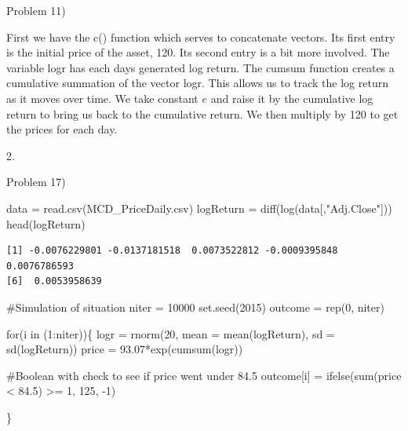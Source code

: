 \documentclass[
  letterpaper,
  DIV=11,
  numbers=noendperiod]{scrartcl}
\newenvironment{Shaded}{\begin{snugshade}}{\end{snugshade}}
\newcommand{\AttributeTok}[1]{\textcolor[rgb]{0.40,0.45,0.13}{#1}}
\newcommand{\CommentTok}[1]{\textcolor[rgb]{0.37,0.37,0.37}{#1}}
\newcommand{\ControlFlowTok}[1]{\textcolor[rgb]{0.00,0.23,0.31}{#1}}
\newcommand{\DecValTok}[1]{\textcolor[rgb]{0.68,0.00,0.00}{#1}}
\newcommand{\FloatTok}[1]{\textcolor[rgb]{0.68,0.00,0.00}{#1}}
\newcommand{\FunctionTok}[1]{\textcolor[rgb]{0.28,0.35,0.67}{#1}}
\newcommand{\NormalTok}[1]{\textcolor[rgb]{0.00,0.23,0.31}{#1}}
\newcommand{\OtherTok}[1]{\textcolor[rgb]{0.00,0.23,0.31}{#1}}
\newcommand{\SpecialCharTok}[1]{\textcolor[rgb]{0.37,0.37,0.37}{#1}}
\newcommand{\StringTok}[1]{\textcolor[rgb]{0.13,0.47,0.30}{#1}}
\begin{document}
Problem 11)

First we have the c() function which serves to concatenate vectors. Its
first entry is the initial price of the asset, 120. Its second entry is
a bit more involved. The variable logr has each days generated log
return. The cumsum function creates a cumulative summation of the vector
logr. This allows us to track the log return as it moves over time. We
take constant \(e\) and raise it by the cumulative log return to bring
us back to the cumulative return. We then multiply by 120 to get the
prices for each day.

2.

Problem 17)\\

\begin{Shaded}
\begin{Highlighting}[]
\NormalTok{data }\OtherTok{=} \FunctionTok{read.csv}\NormalTok{(}\StringTok{\textquotesingle{}MCD\_PriceDaily.csv\textquotesingle{}}\NormalTok{)}
\NormalTok{logReturn }\OtherTok{=} \FunctionTok{diff}\NormalTok{(}\FunctionTok{log}\NormalTok{(data[,}\StringTok{"Adj.Close"}\NormalTok{]))}
\FunctionTok{head}\NormalTok{(logReturn)}
\end{Highlighting}
\end{Shaded}

\begin{verbatim}
[1] -0.0076229801 -0.0137181518  0.0073522812 -0.0009395848  0.0076786593
[6]  0.0053958639
\end{verbatim}

\begin{Shaded}
\begin{Highlighting}[]
\CommentTok{\#Simulation of situation}
\NormalTok{niter }\OtherTok{=} \DecValTok{10000}
\FunctionTok{set.seed}\NormalTok{(}\DecValTok{2015}\NormalTok{)}
\NormalTok{outcome }\OtherTok{=} \FunctionTok{rep}\NormalTok{(}\DecValTok{0}\NormalTok{, niter)}

\ControlFlowTok{for}\NormalTok{(i }\ControlFlowTok{in}\NormalTok{ (}\DecValTok{1}\SpecialCharTok{:}\NormalTok{niter))\{}
\NormalTok{  logr }\OtherTok{=} \FunctionTok{rnorm}\NormalTok{(}\DecValTok{20}\NormalTok{, }\AttributeTok{mean =} \FunctionTok{mean}\NormalTok{(logReturn), }\AttributeTok{sd =} \FunctionTok{sd}\NormalTok{(logReturn))}
\NormalTok{  price }\OtherTok{=} \FloatTok{93.07}\SpecialCharTok{*}\FunctionTok{exp}\NormalTok{(}\FunctionTok{cumsum}\NormalTok{(logr))}
  
  \CommentTok{\#Boolean with check to see if price went under 84.5}
\NormalTok{  outcome[i] }\OtherTok{=} \FunctionTok{ifelse}\NormalTok{(}\FunctionTok{sum}\NormalTok{(price }\SpecialCharTok{\textless{}} \FloatTok{84.5}\NormalTok{) }\SpecialCharTok{\textgreater{}=} \DecValTok{1}\NormalTok{, }\DecValTok{125}\NormalTok{, }\SpecialCharTok{{-}}\DecValTok{1}\NormalTok{)}
  
\NormalTok{\}}
\end{Highlighting}
\end{Shaded}
\end{document}

